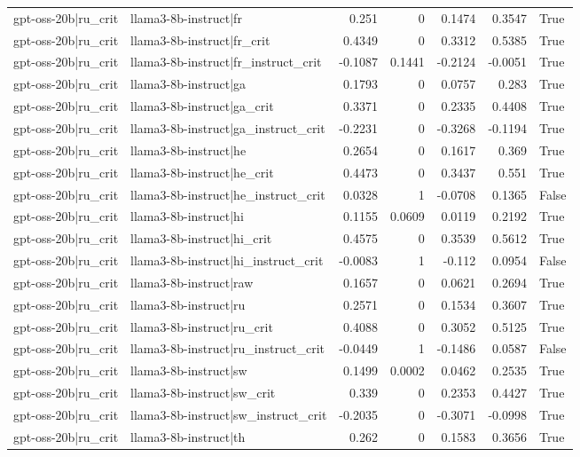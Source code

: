 \begin{table}
\begin{tabular}{l l r r r r l}
gpt-oss-20b|ru_crit & llama3-8b-instruct|fr & 0.251 & 0 & 0.1474 & 0.3547 & True \\
gpt-oss-20b|ru_crit & llama3-8b-instruct|fr_crit & 0.4349 & 0 & 0.3312 & 0.5385 & True \\
gpt-oss-20b|ru_crit & llama3-8b-instruct|fr_instruct_crit & -0.1087 & 0.1441 & -0.2124 & -0.0051 & True \\
gpt-oss-20b|ru_crit & llama3-8b-instruct|ga & 0.1793 & 0 & 0.0757 & 0.283 & True \\
gpt-oss-20b|ru_crit & llama3-8b-instruct|ga_crit & 0.3371 & 0 & 0.2335 & 0.4408 & True \\
gpt-oss-20b|ru_crit & llama3-8b-instruct|ga_instruct_crit & -0.2231 & 0 & -0.3268 & -0.1194 & True \\
gpt-oss-20b|ru_crit & llama3-8b-instruct|he & 0.2654 & 0 & 0.1617 & 0.369 & True \\
gpt-oss-20b|ru_crit & llama3-8b-instruct|he_crit & 0.4473 & 0 & 0.3437 & 0.551 & True \\
gpt-oss-20b|ru_crit & llama3-8b-instruct|he_instruct_crit & 0.0328 & 1 & -0.0708 & 0.1365 & False \\
gpt-oss-20b|ru_crit & llama3-8b-instruct|hi & 0.1155 & 0.0609 & 0.0119 & 0.2192 & True \\
gpt-oss-20b|ru_crit & llama3-8b-instruct|hi_crit & 0.4575 & 0 & 0.3539 & 0.5612 & True \\
gpt-oss-20b|ru_crit & llama3-8b-instruct|hi_instruct_crit & -0.0083 & 1 & -0.112 & 0.0954 & False \\
gpt-oss-20b|ru_crit & llama3-8b-instruct|raw & 0.1657 & 0 & 0.0621 & 0.2694 & True \\
gpt-oss-20b|ru_crit & llama3-8b-instruct|ru & 0.2571 & 0 & 0.1534 & 0.3607 & True \\
gpt-oss-20b|ru_crit & llama3-8b-instruct|ru_crit & 0.4088 & 0 & 0.3052 & 0.5125 & True \\
gpt-oss-20b|ru_crit & llama3-8b-instruct|ru_instruct_crit & -0.0449 & 1 & -0.1486 & 0.0587 & False \\
gpt-oss-20b|ru_crit & llama3-8b-instruct|sw & 0.1499 & 0.0002 & 0.0462 & 0.2535 & True \\
gpt-oss-20b|ru_crit & llama3-8b-instruct|sw_crit & 0.339 & 0 & 0.2353 & 0.4427 & True \\
gpt-oss-20b|ru_crit & llama3-8b-instruct|sw_instruct_crit & -0.2035 & 0 & -0.3071 & -0.0998 & True \\
gpt-oss-20b|ru_crit & llama3-8b-instruct|th & 0.262 & 0 & 0.1583 & 0.3656 & True \\

\end{tabular}
\end{table}
